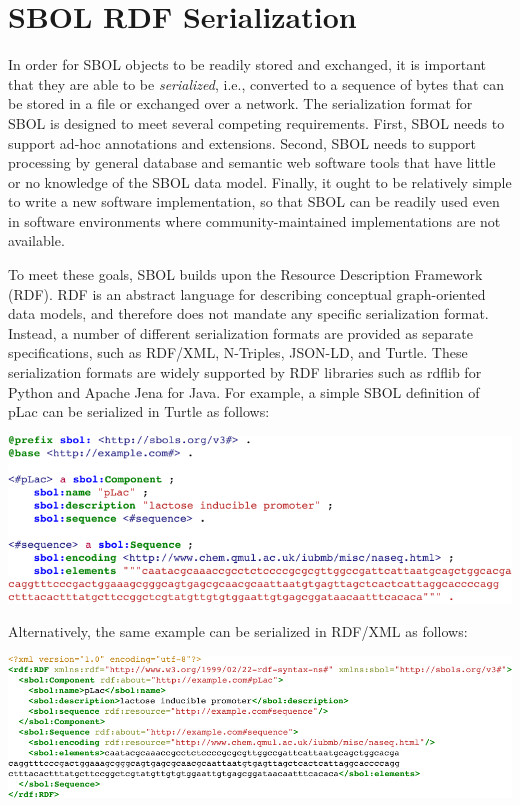 \section{SBOL RDF Serialization}
\label{sec:serialization}

In order for SBOL objects to be readily stored and exchanged, it is important that they are able to be {\em serialized}, i.e., converted to a sequence of bytes that can be stored in a file or exchanged over a network.  The serialization format for SBOL is designed to meet several competing requirements. 
First, SBOL needs to support ad-hoc annotations and extensions. 
Second, SBOL needs to support processing by general database and semantic web software tools that have little or no knowledge of the SBOL data model. 
Finally, it ought to be relatively simple to write a new software implementation, so that SBOL can be readily used even in software environments where community-maintained implementations are not available.

To meet these goals, SBOL builds upon the Resource Description Framework (RDF).  RDF is an abstract language for describing conceptual graph-oriented data models, and therefore does not mandate any specific serialization format.  Instead, a number of different serialization formats are provided as separate specifications, such as RDF/XML, N-Triples, JSON-LD, and Turtle.  These serialization formats are widely supported by RDF libraries such as rdflib for Python and Apache Jena for Java.   For example, a simple SBOL definition of pLac can be serialized in Turtle as follows:

\vspace{3mm}
\includegraphics{example_serialization/example_turtle.pdf}

Alternatively, the same example can be serialized in RDF/XML as follows:

\vspace{3mm}
\includegraphics{example_serialization/example_rdfxml.pdf}

